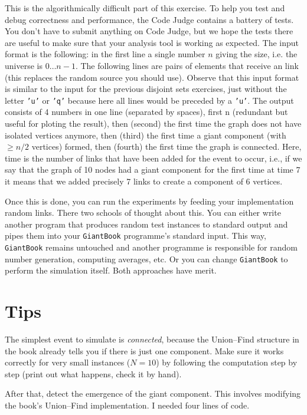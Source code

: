 \documentclass{tufte-handout}
\begin{document}
This is the algorithmically difficult part of this exercise.
To help you test and debug correctness and performance, the Code Judge contains a battery of tests.
You don't have to submit anything on Code Judge, but we hope the tests there are useful to make sure that your analysis tool is working as expected.
The input format is the following: in the first line a single number $n$ giving the size, i.e. the universe is $0\ldots n-1$.
The following lines are pairs of elements that receive an link (this replaces the random source you should use).
Observe that this input format is similar to the input for the previous disjoint sets exercises, just without the letter \texttt{'u'} or \texttt{'q'} because here all lines would be preceded by a \texttt{'u'}.
The output consists of 4 numbers in one line (separated by spaces), first n (redundant but useful for ploting the result), then (second) the first time the graph does not have isolated vertices anymore, then (third) the first time a giant component (with $\geq n/2$ vertices) formed, then (fourth) the first time the graph is connected.
Here, time is the number of links that have been added for the event to occur, i.e., if we say that the graph of 10 nodes had a giant component for the first time at time 7 it means that we added precisely 7 links to create a component of 6 vertices.

\medskip
Once this is done, you can run the experiments by feeding your implementation random links.
There two schools of thought about this.
You can either write another program that produces random test instances to standard output and pipes them into your \texttt{GiantBook} programme's standard input.
This way, \texttt{GiantBook} remains untouched and another programme is responsible for random number generation, computing averages, etc.
Or you can change \texttt{GiantBook} to perform the simulation itself.
Both approaches have merit.

\section{Tips}

The simplest event to simulate is \emph{connected}, because
the Union--Find structure in the book already tells you if there is
just one component.
Make sure it works correctly for very small instances ($N=10$) by
following the computation step by step (print out what happens, check
it by hand).

After that, detect the emergence of the giant component.
This involves modifying the book's Union--Find implementation.
I needed four lines of code.
\end{document}

